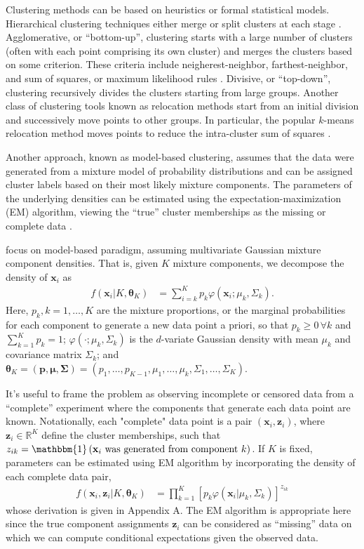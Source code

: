 \documentclass{uwstat572}
\newcommand*\reals{\mathbb{R}}
\newcommand*\ba{\[ \begin{aligned}}
\newcommand*\ea{\end{aligned} \]}
\newcommand*\ind[1]{\mathbbm{1}\left(#1\right)}
\newcommand*\bp{\mathbf{p}}
\newcommand*\bx{\mathbf{x}}
\newcommand*\bz{\mathbf{z}}
\newcommand*\btheta{\boldsymbol{\theta}}
\newcommand*\bmu{\boldsymbol{\mu}}
\newcommand*\bSigma{\boldsymbol{\Sigma}}
\renewcommand\;{\,}
\renewcommand\phi{\varphi}
\begin{document}
Clustering methods can be based on heuristics or formal statistical models.
Hierarchical clustering techniques either merge or split clusters at each stage \citep{Fraley98}.
Agglomerative, or ``bottom-up'', clustering starts with a large number of clusters (often with each point comprising its own cluster) and merges the clusters based on some criterion.
These criteria include neigherest-neighbor, farthest-neighbor, and sum of squares, or maximum likelihood rules \citep{Kaufman90, Murtagh84, Banfield93}.
Divisive, or ``top-down'', clustering recursively divides the clusters starting from large groups. 
Another class of clustering tools known as relocation methods start from an initial division and successively move points to other groups.
In particular, the popular $k$-means relocation method moves points to reduce the intra-cluster sum of squares \citep{Hartigan78}. 



Another approach, known as model-based clustering, assumes that the data were generated from a mixture model of probability distributions and can be assigned cluster labels based on their most likely mixture components.
The parameters of the underlying densities can be estimated using the expectation-maximization (EM) algorithm, viewing the ``true'' cluster memberships as the missing or complete data \citep{McLachlan88, Dempster77}. 


\cite{Baudry10} focus on model-based paradigm, assuming multivariate Gaussian mixture component densities. 
That is, given $K$ mixture components, we decompose the density of $\bx_i$ as
\ba
f(\bx_i | K, \btheta_K)
	& = \sum_{i=k}^K p_k \phi \left(\bx_i ; \mu_k, \Sigma_k \right).
\ea
Here, $p_k, k = 1, \dotsc, K$ are the mixture proportions, or the marginal probabilities for each component to generate a new data point a priori, so that $p_k \ge 0 \; \forall k$ and $\sum_{k=1}^K p_k = 1$; $\phi(\cdot; \mu_k, \Sigma_k)$ is the $d$-variate Gaussian density with mean $\mu_k$ and covariance matrix $\Sigma_k$; and $\btheta_K = (\bp, \bmu, \bSigma) = (p_1, \dotsc, p_{K - 1}, \mu_1, \dotsc, \mu_k, \Sigma_1, \dotsc, \Sigma_K)$.

It's useful to frame the problem as observing incomplete or censored data from a ``complete'' experiment where the components that generate each data point are known. Notationally, each "complete" data point is a pair $(\bx_i, \bz_i)$, where 
$\bz_i \in \reals^K$ define the cluster memberships, such that $z_{ik} = \ind{\bx_i \text{ was generated from component $k$}}$.  
If $K$ is fixed, parameters can be estimated using EM algorithm by incorporating the density of each complete data pair,
\ba
f(\bx_i, \bz_i | K, \btheta_K)
	& = \prod_{k=1}^K \left[ p_k \phi(\bx_i | \mu_k, \Sigma_k) \right]^{z_{ik}}
\ea
whose derivation is given in Appendix A.
The EM algorithm is appropriate here since the true component assignments $\bz_i$ can be considered as ``missing'' data on which we can compute conditional expectations given the observed data.
\end{document}
